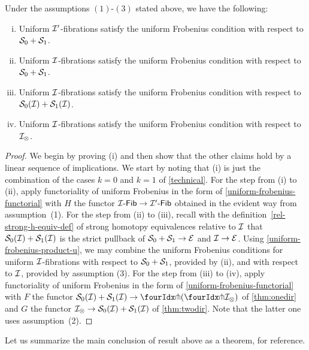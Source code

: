 \documentclass[reqno,10pt,a4paper,oneside,draft]{amsart}
\begin{document}
\begin{proposition} Under the assumptions $(1)$-$(3)$ stated above, 
we have the following:
\begin{enumerate}[(i)]
\item 
Uniform $\cal{I}'$-fibrations satisfy the uniform Frobenius condition with respect to $\cal{S}_0 + \cal{S}_1$.
\item
Uniform $\cal{I}$-fibrations satisfy the uniform Frobenius condition with respect to $\cal{S}_0 + \cal{S}_1$.
\item
Uniform $\cal{I}$-fibrations satisfy the uniform Frobenius condition with respect to $\cal{S}_0(\cal{I}) + \cal{S}_1(\cal{I})$.
\item
Uniform $\cal{I}$-fibrations satisfy the uniform Frobenius condition with respect to $\cal{I}_\otimes$.
\end{enumerate}
\end{proposition}

\begin{proof} We begin by proving (i) and then show that the other claims hold by a linear sequence of implications.
We start by noting that (i) is just the combination of the cases $k = 0$ and $k = 1$ of \cref{technical}.
For the step from (i) to (ii), apply functoriality of uniform Frobenius in the form of \cref{uniform-frobenius-functorial} with $H$ the functor $\Fib{\cal{I}} \to \Fib{\cal{I}'}$ obtained in the evident way from assumption~(1).
For the step from (ii) to (iii), recall with the definition~\eqref{rel-strong-h-equiv-def} of strong homotopy equivalences relative to $\cal{I}$ that $\cal{S}_0(\cal{I}) + \cal{S}_1(\cal{I})$ is the strict pullback of $\cal{S}_0 + \cal{S}_1 \to \cal{E}$ and $\cal{I} \to \cal{E}$.
Using \cref{uniform-frobenius-product-u}, we may combine the uniform Frobenius conditions for uniform $\cal{I}$-fibrations with respect to $\cal{S}_0 + \cal{S}_1$, provided by (ii), and with respect to $\cal{I}$, provided by assumption (3).
For the step from (iii) to (iv), apply functoriality of uniform Frobenius in the form of \cref{uniform-frobenius-functorial} with $F$ the functor $\cal{S}_0(\cal{I}) + \cal{S}_1(\cal{I}) \to \liftl{(\liftr{\cal{I}_\otimes})}$ of \cref{thm:onedir} and $G$ the functor $\cal{I}_\otimes \to \cal{S}_0(\cal{I}) + \cal{S}_1(\cal{I})$ of \cref{thm:twodir}.
Note that the latter one uses assumption~(2).
\end{proof}

Let us summarize the main conclusion of result above as a theorem, for reference.
\end{document}

